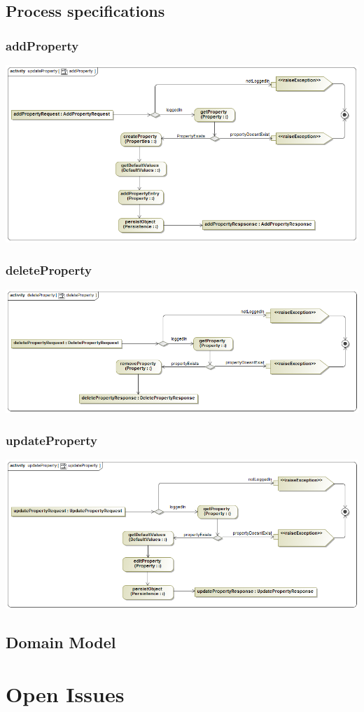 \documentclass[a4paper,12pt]{article}
\begin{document}
\subsection{Process specifications}
\subsubsection{addProperty}
\includegraphics[width=1\textwidth]{./Images/processSpecification/addProperty.png}
\subsubsection{deleteProperty}
\includegraphics[width=1\textwidth]{./Images/processSpecification/deleteProperty.png}
\subsubsection{updateProperty}
\includegraphics[width=1\textwidth]{./Images/processSpecification/updateProperty.png}
\subsection{Domain Model}

\newpage
\section{Open Issues}
\end{document}
